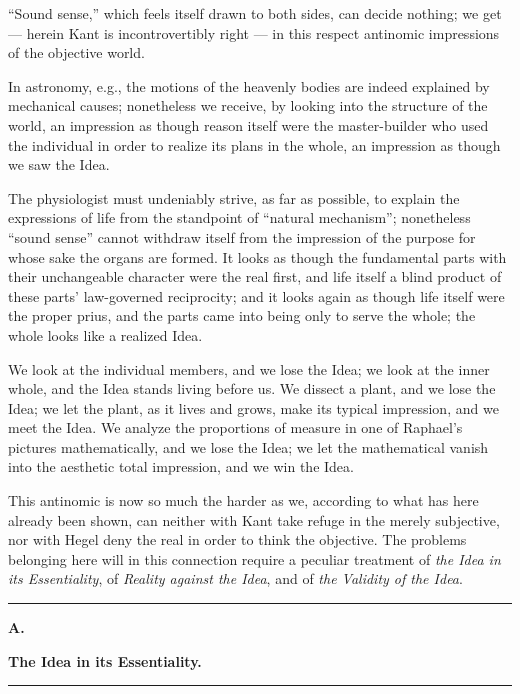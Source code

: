 \documentclass[12pt]{book}
\begin{document}
``Sound sense,'' which feels itself drawn to both sides, can decide nothing; we get — herein Kant is
incontrovertibly right — in this respect antinomic impressions of the objective world.

In astronomy, e.g., the motions of the heavenly bodies are indeed explained by mechanical causes;
nonetheless we receive, by looking into the structure of the world, an impression as though reason
itself were the master-builder who used the individual in order to realize its plans in the whole, an
impression as though we saw the Idea.

The physiologist must undeniably strive, as far as possible, to explain the expressions of life from
the standpoint of ``natural mechanism''; nonetheless ``sound sense'' cannot withdraw itself from the
impression of the purpose for whose sake the organs are formed. It looks as though the fundamental
parts with their unchangeable character were the real first, and life itself a blind product of these
parts' law-governed reciprocity; and it looks again as though life itself were the proper prius, and
the parts came into being only to serve the whole; the whole looks like a realized Idea.

We look at the individual members, and we lose the Idea; we look at the inner whole, and the Idea
stands living before us. We
dissect a plant, and we lose the Idea; we let the plant, as it lives and grows, make its typical
impression, and we meet the Idea. We analyze the proportions of measure in one of Raphael's pictures
mathematically, and we lose the Idea; we let the mathematical vanish into the aesthetic total
impression, and we win the Idea.

This antinomic is now so much the harder as we, according to what has here already been shown, can
neither with Kant take refuge in the merely subjective, nor with Hegel deny the real in order to
think the objective. The problems belonging here will in this connection require a peculiar treatment
of \emph{the Idea in its Essentiality}, of \emph{Reality against the Idea}, and of \emph{the Validity
of the Idea}.

\begin{center}\rule{0.35\linewidth}{0.4pt}\end{center}

\begin{center}
  {\large\bfseries A.}\par\vspace{2pt}
  {\bfseries The Idea in its Essentiality.}\par\vspace{4pt}
  \rule{2cm}{0.4pt}
\end{center}
{}
\end{document}
